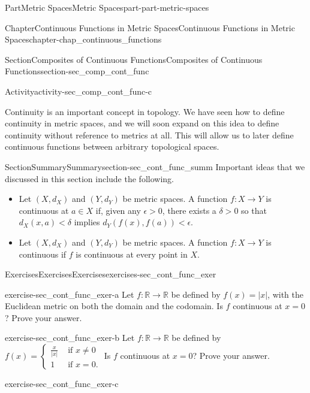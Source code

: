 \documentclass[oneside,10pt,]{book}
\numberwithin{equation}{chapter}
\newcommand{\R}{\mathbb{R}}
\newcommand{\lt}{<}
\newcommand{\gt}{>}
\newcommand{\amp}{&}
\begin{document}
\begin{partptx}{Part}{Metric Spaces}{}{Metric Spaces}{}{}{part-part-metric-spaces}
\begin{chapterptx}{Chapter}{Continuous Functions in Metric Spaces}{}{Continuous Functions in Metric Spaces}{}{}{chapter-chap_continuous_functions}
\begin{sectionptx}{Section}{Composites of Continuous Functions}{}{Composites of Continuous Functions}{}{}{section-sec_comp_cont_func}
\begin{activity}{Activity}{}{activity-sec_comp_cont_func-c}
\begin{enumerate}[font=\bfseries,label=(\alph*),ref=\alph*]
\end{enumerate}%
\end{activity}%
Continuity is an important concept in topology. We have seen how to define continuity in metric spaces, and we will soon expand on this idea to define continuity without reference to metrics at all. This will allow us to later define continuous functions between arbitrary topological spaces.%
\end{sectionptx}
%
%
\typeout{************************************************}
\typeout{************************************************}
%
\begin{sectionptx}{Section}{Summary}{}{Summary}{}{}{section-sec_cont_func_summ}
Important ideas that we discussed in this section include the following.%
\begin{itemize}[label=\textbullet]
\item{}Let \((X,d_X)\) and \((Y, d_Y)\) be metric spaces. A function \(f:X \to Y\) is continuous at \(a \in X\) if, given any \(\epsilon \gt 0\), there exists a \(\delta \gt 0\) so that \(d_X(x,a)\lt \delta\) implies \(d_Y(f(x), f(a)) \lt \epsilon\).%
\item{}Let \((X,d_X)\) and \((Y, d_Y)\) be metric spaces. A function \(f:X \to Y\) is continuous if \(f\) is continuous at every point in \(X\).%
\end{itemize}
%
\end{sectionptx}
%
%
\typeout{************************************************}
\typeout{************************************************}
%
\begin{exercises-section}{Exercises}{Exercises}{}{Exercises}{}{}{exercises-sec_cont_func_exer}
\begin{divisionexercise}{1}{}{}{exercise-sec_cont_func_exer-a}%
Let \(f: \R \to \R\) be defined by \(f(x) = |x|\), with the Euclidean metric on both the domain and the codomain. Is \(f\) continuous at \(x=0\)? Prove your answer.%
\end{divisionexercise}%
\begin{divisionexercise}{2}{}{}{exercise-sec_cont_func_exer-b}%
Let \(f: \R \to \R\) be defined by \(f(x) = \begin{cases}\frac{x}{|x|} \amp \text{ if } x \neq 0 \\ 1 \amp \text{ if } x=0. \end{cases}\) Is \(f\) continuous at \(x=0\)? Prove your answer.%
\end{divisionexercise}%
\begin{divisionexercise}{3}{}{}{exercise-sec_cont_func_exer-c}%

\end{divisionexercise}
\end{exercises-section}
\end{chapterptx}
\end{partptx}
\end{document}
